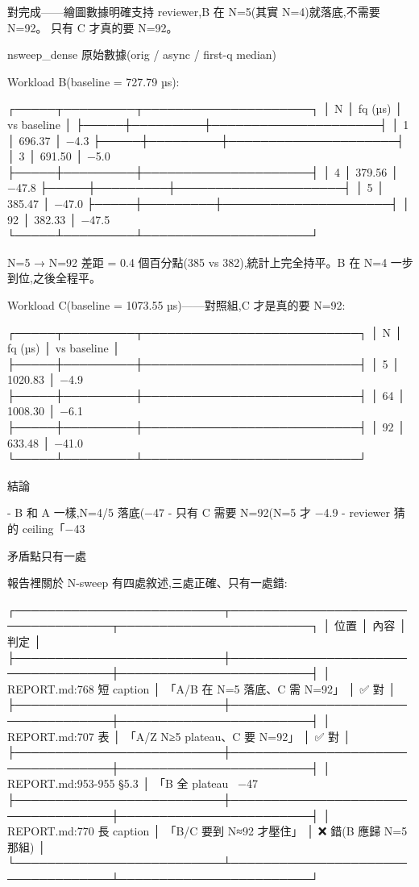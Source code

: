 對完成——繪圖數據明確支持 reviewer,B 在 N=5(其實 N=4)就落底,不需要 N=92。 只有 C 才真的要 N=92。

nsweep_dense 原始數據(orig / async / first-q median)

Workload B(baseline = 727.79 µs):

┌─────┬─────────┬─────────────────────┐
│  N  │ fq (µs) │     vs baseline     │
├─────┼─────────┼─────────────────────┤
│ 1   │ 696.37  │ −4.3%
├─────┼─────────┼─────────────────────┤
│ 3   │ 691.50  │ −5.0%
├─────┼─────────┼─────────────────────┤
│ 4   │ 379.56  │ −47.8%
├─────┼─────────┼─────────────────────┤
│ 5   │ 385.47  │ −47.0%
├─────┼─────────┼─────────────────────┤
│ 92  │ 382.33  │ −47.5%
└─────┴─────────┴─────────────────────┘

N=5 → N=92 差距 = 0.4 個百分點(385 vs 382),統計上完全持平。B 在 N=4 一步到位,之後全程平。

Workload C(baseline = 1073.55 µs)——對照組,C 才是真的要 N=92:

┌─────┬─────────┬───────────────────────────┐
│  N  │ fq (µs) │        vs baseline        │
├─────┼─────────┼───────────────────────────┤
│ 5   │ 1020.83 │ −4.9%
├─────┼─────────┼───────────────────────────┤
│ 64  │ 1008.30 │ −6.1%
├─────┼─────────┼───────────────────────────┤
│ 92  │ 633.48  │ −41.0%
└─────┴─────────┴───────────────────────────┘

結論

- B 和 A 一樣,N=4/5 落底(−47%
- 只有 C 需要 N=92(N=5 才 −4.9%
- reviewer 猜的 ceiling「−43%

矛盾點只有一處

報告裡關於 N-sweep 有四處敘述,三處正確、只有一處錯:

┌──────────────────────────┬───────────────────────────────────┬────────────────────────┐
│           位置           │               內容                │          判定          │
├──────────────────────────┼───────────────────────────────────┼────────────────────────┤
│ REPORT.md:768 短 caption │ 「A/B 在 N=5 落底、C 需 N=92」    │ ✅ 對                  │
├──────────────────────────┼───────────────────────────────────┼────────────────────────┤
│ REPORT.md:707 表         │ 「A/Z N≥5 plateau、C 要 N=92」    │ ✅ 對                  │
├──────────────────────────┼───────────────────────────────────┼────────────────────────┤
│ REPORT.md:953-955 §5.3   │ 「B 全 plateau ~−47%
├──────────────────────────┼───────────────────────────────────┼────────────────────────┤
│ REPORT.md:770 長 caption │ 「B/C 要到 N≈92 才壓住」          │ ❌ 錯(B 應歸 N=5 那組) │
└──────────────────────────┴───────────────────────────────────┴────────────────────────┘